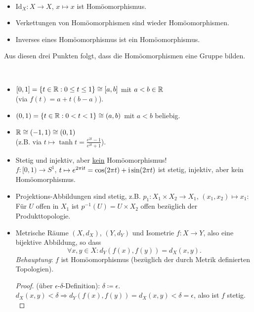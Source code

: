 \begin{remark}[Homöomorphismengruppe]
  \
  \begin{itemize}
    \item \( \text{Id}_X: X \to X \), \( x \mapsto x \) ist Homöomorphismus.
    \item Verkettungen von Homöomorphismen sind wieder Homöomorphismen.
    \item Inverses eines Homöomorphismus ist ein Homöomorphismus.
  \end{itemize}
  Aus diesen drei Punkten folgt, dass die Homöomorphismen eine Gruppe bilden.
\end{remark}

\begin{example}
  \
  \begin{itemize}
    \item \( [0,1] = \{ t \in \mathbb{R} : 0 \leq t \leq 1 \} \cong [a,b] \) mit \( a < b \in \mathbb{R} \) \\ (via \( f(t) = a+t(b-a) \)).
    \item \( (0,1) = \{ t \in \mathbb{R} : 0 < t < 1 \} \cong (a,b) \) mit \( a < b \) beliebig. 
    \item \( \mathbb{R} \cong (-1, 1) \cong (0,1) \) \\ (z.B. via \( t \mapsto \tanh t = \tfrac{e^{2t}-1}{e^{2t}+1} \)).
    \item Stetig und injektiv, aber \underline{kein} Homöomorphismus! \\
      \( f: [0,1) \to S^1 \), \( t \mapsto e^{2\pi\text{\rmfamily i} t} = \cos(2\pi t) + \text{\rmfamily i}\sin(2\pi t) \) ist stetig, injektiv, aber kein Homöomorphismus.
    \item Projektions-Abbildungen sind stetig, z.B. \( p_1: X_1 \times X_2 \to X_1 \), \( (x_1,x_2) \mapsto x_1 \): Für \( U \) offen in \( X_1 \) ist \( p^{-1}(U) = U \times X_2 \) offen bezüglich der Produkttopologie.
    \item Metrische Räume \( (X, d_X) \), \( (Y, d_Y) \) und Isometrie \( f: X \to Y \), also eine bijektive Abbildung, so dass
      \begin{equation*}
        \forall x, y \in X : d_Y(f(x), f(y)) = d_X(x, y)\text{.}
      \end{equation*}
      \emph{Behauptung}: \( f \) ist Homöomorphismus (bezüglich der durch Metrik definierten Topologien).
      \begin{proof}
        (über \( \epsilon \)-\( \delta \)-Definition): \( \delta \coloneqq \epsilon \). \\
        \( d_X(x, y) < \delta \Rightarrow d_Y(f(x), f(y)) = d_X(x,y) < \delta = \epsilon \), also ist \( f \) stetig. \\

\end{proof}
\end{itemize}
\end{example}
